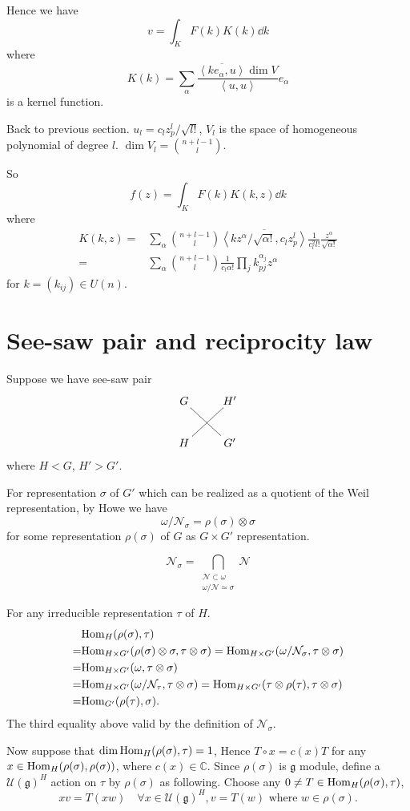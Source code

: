 \documentclass[12pt]{article}
\def\Hom{{\rm Hom}}
\def\bC{{\mathbb{C}}}
\def\inn#1#2{\left\langle{#1},{#2}\right\rangle}
\def\fgg{\mathfrak{g}}
\def\cnn{\mathcal{N}}
\def\cuu{\mathcal{U}}
\begin{document}
Hence we have 
\[
v = \int_K F(k) K(k) \dd k
\]
where 
\[
K(k) = \sum_{\alpha} \frac{\overline{\inn{ke_\alpha}{u}}\dim V}{\inn{u}{u}} e_\alpha 
\]
is a kernel function. 

Back to previous section. $u_l = c_l z_p^l/\sqrt{l!}$, $V_l$ is the space of homogeneous polynomial of degree $l$.
$\dim V_l  = \binom{n+l-1}{l}$.
   
So 
\[
f(z) = \int_K F(k) K(k,z) \dd k 
\]
where 
\[
\begin{split}
K(k,z) =& \sum_{\alpha} \binom{n+l-1}{l} 
\overline{\inn{k z^\alpha/\sqrt{\alpha!}}{c_lz_p^l}}\frac{1}{c_l^2l!}
\frac{z^\alpha}{\sqrt{\alpha!}}\\
= & \sum_\alpha \binom{n+l-1}{l}\frac{1}{c_l \alpha!}
\prod_j k_{pj}^{\alpha_j} z^\alpha
\end{split}
\]
for $k = (k_{ij}) \in U(n)$. 

\section{See-saw pair and reciprocity law}
Suppose we have see-saw pair
\[
\xymatrix{G \ar@{-}[dr] & H'\\
H\ar@{-}[ur] & G'
}
\]
where $H < G$, $H'> G'$. 

For representation $\sigma$ of $G'$ which can be realized as a quotient of
the Weil representation, by Howe we have
\[
 \omega/\cnn_\sigma= \rho(\sigma)\otimes \sigma
\]
for some representation $\rho(\sigma)$ of $G$ as $G\times G'$ representation.

\[
\cnn_\sigma = \bigcap_{\substack{\cnn\subset \omega\\ \omega/\cnn\simeq \sigma}}\cnn
\]

For any irreducible representation $\tau$ of $H$.
\[
\begin{split}
&\Hom_{H}(\rho(\sigma), \tau)\\
= & \Hom_{H\times G'}(\rho(\sigma)\otimes \sigma, \tau\otimes \sigma)
=  \Hom_{H\times G'}(\omega/\cnn_\sigma, \tau\otimes \sigma)\\
= & \Hom_{H\times G'}(\omega, \tau\otimes \sigma)\\
= & \Hom_{H\times G'}(\omega/\cnn_\tau, \tau\otimes \sigma)
= \Hom_{H\times G'}(\tau\otimes \rho(\tau), \tau\otimes \sigma)\\
= & \Hom_{G'}(\rho(\tau), \sigma).
\end{split}
\]
The third equality above valid by the definition of $\cnn_\sigma$. 


Now suppose that $\dim \Hom_{H}(\rho(\sigma),\tau)=1$,
Hence $T\circ x = c(x) T$ for any $x\in \Hom_{H}(\rho(\sigma),\rho(\sigma))$, where $c(x)\in \bC$.
Since $\rho(\sigma)$ is $\fgg$ module, define a $\cuu(\fgg)^H$ action 
on $\tau$ by $\rho(\sigma)$ as following.
Choose any $0 \neq T\in \Hom_{H}(\rho(\sigma),\tau)$,
\[
x v = T(x w) \quad  \forall x\in \cuu(\fgg)^H, v=T(w) 
\text{ where } w\in \rho(\sigma).
\] 
\end{document}
